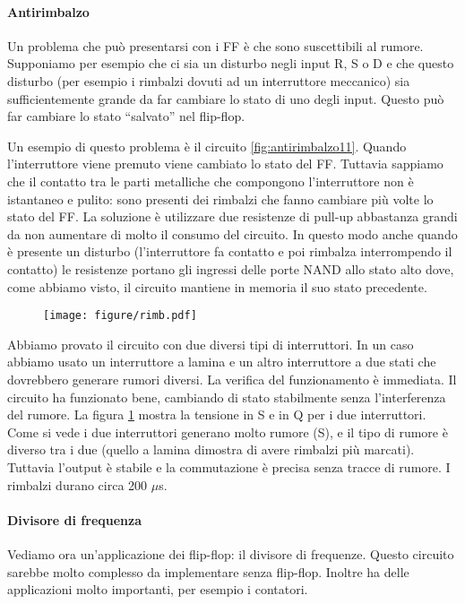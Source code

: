 \paragraph{Antirimbalzo}

Un problema che può presentarsi con i FF è che sono suscettibili al rumore. Supponiamo per esempio che
ci sia un disturbo negli input R, S o D e che questo disturbo (per esempio i rimbalzi dovuti ad un
interruttore meccanico) sia sufficientemente grande da far cambiare lo stato di uno degli input.
Questo può far cambiare lo stato ``salvato'' nel flip-flop.


Un esempio di questo problema è il circuito \ref{fig:antirimbalzo11}. Quando l'interruttore viene premuto
viene cambiato lo stato del FF. Tuttavia sappiamo che il contatto tra le parti metalliche che compongono l'interruttore
non è istantaneo e pulito: sono presenti dei rimbalzi che fanno cambiare più volte lo stato del FF.
La soluzione è utilizzare due resistenze di pull-up abbastanza grandi da non aumentare di molto il consumo del circuito.
In questo modo anche quando è presente un disturbo (l'interruttore fa contatto e poi rimbalza interrompendo il contatto)
le resistenze portano gli ingressi delle porte NAND allo stato alto dove, come abbiamo visto,
il circuito mantiene in memoria il suo stato precedente.

\begin{figure}
	\centering
	\texttt{[image: figure/rimb.pdf]}
	\caption{}
	\label{fig:rimb11}
\end{figure}

Abbiamo provato il circuito con due diversi tipi di interruttori. In un caso abbiamo usato un interruttore a lamina
e un altro interruttore a due stati che dovrebbero generare rumori diversi. La verifica del funzionamento è immediata. Il circuito ha funzionato bene,
cambiando di stato stabilmente senza l'interferenza del rumore. La figura \ref{fig:rimb11} mostra la tensione in S e in Q
per i due interruttori. Come si vede i due interruttori generano molto rumore (S), e il tipo di rumore è diverso tra i due
(quello a lamina dimostra di avere rimbalzi più marcati). Tuttavia l'output è stabile e la commutazione è precisa senza
tracce di rumore. I rimbalzi durano circa 200 $\mu$s.

\paragraph{Divisore di frequenza}

Vediamo ora un'applicazione dei flip-flop: il divisore di frequenze. Questo circuito sarebbe molto complesso da
implementare senza flip-flop. Inoltre ha delle applicazioni molto importanti, per esempio i contatori.

